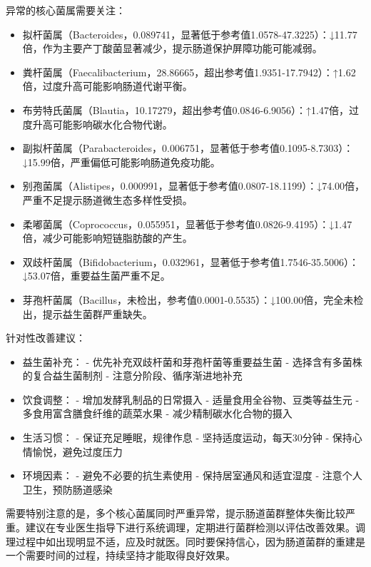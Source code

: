 \documentclass[UTF8]{ctexart}
\begin{document}
\begin{tcolorbox}[
    enhanced,
    colback=gray!3,
    colframe=gray!3,
    arc=3mm,
    boxrule=0pt,
    width=\textwidth,
    top=8pt,
    bottom=8pt
    ]
{\small{\textcolor{yellow!85!orange}{\faLightbulb}}\quad 异常的核心菌属需要关注：
\begin{itemize}
\item 拟杆菌属（Bacteroides，0.089741，显著低于参考值1.0578-47.3225）：↓11.77倍，作为主要产丁酸菌显著减少，提示肠道保护屏障功能可能减弱。
\item 粪杆菌属（Faecalibacterium，28.86665，超出参考值1.9351-17.7942）：↑1.62倍，过度升高可能影响肠道代谢平衡。
\item 布劳特氏菌属（Blautia，10.17279，超出参考值0.0846-6.9056）：↑1.47倍，过度升高可能影响碳水化合物代谢。
\item 副拟杆菌属（Parabacteroides，0.006751，显著低于参考值0.1095-8.7303）：↓15.99倍，严重偏低可能影响肠道免疫功能。
\item 别孢菌属（Alistipes，0.000991，显著低于参考值0.0807-18.1199）：↓74.00倍，严重不足提示肠道微生态多样性受损。
\item 柔嘟菌属（Coprococcus，0.055951，显著低于参考值0.0826-9.4195）：↓1.47倍，减少可能影响短链脂肪酸的产生。
\item 双歧杆菌属（Bifidobacterium，0.032961，显著低于参考值1.7546-35.5006）：↓53.07倍，重要益生菌严重不足。
\item 芽孢杆菌属（Bacillus，未检出，参考值0.0001-0.5535）：↓100.00倍，完全未检出，提示益生菌群严重缺失。
\end{itemize}

{\textcolor{green!85!black}{\faLightbulb}}\quad 针对性改善建议：
\begin{itemize}
\item 益生菌补充：
    - 优先补充双歧杆菌和芽孢杆菌等重要益生菌
    - 选择含有多菌株的复合益生菌制剂
    - 注意分阶段、循序渐进地补充
\item 饮食调整：
    - 增加发酵乳制品的日常摄入
    - 适量食用全谷物、豆类等益生元
    - 多食用富含膳食纤维的蔬菜水果
    - 减少精制碳水化合物的摄入
\item 生活习惯：
    - 保证充足睡眠，规律作息
    - 坚持适度运动，每天30分钟
    - 保持心情愉悦，避免过度压力
\item 环境因素：
    - 避免不必要的抗生素使用
    - 保持居室通风和适宜湿度
    - 注意个人卫生，预防肠道感染
\end{itemize}

需要特别注意的是，多个核心菌属同时严重异常，提示肠道菌群整体失衡比较严重。建议在专业医生指导下进行系统调理，定期进行菌群检测以评估改善效果。调理过程中如出现明显不适，应及时就医。同时要保持信心，因为肠道菌群的重建是一个需要时间的过程，持续坚持才能取得良好效果。
}
\end{tcolorbox}
\end{document}

